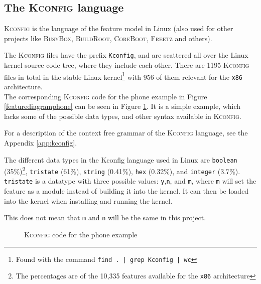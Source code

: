 \documentclass[a4paper,11pt]{report}
\newcommand{\f}{\footnote{\fn}}
\newcommand{\textcode}[1]{\fboxsep=1pt\texttt{\colorbox{gray!20}{#1}}}
\newcommand{\figa}{
    \begin{figure}[!htpb]
    \centering
}
\newcommand{\figb}[2]{
    \caption{#1}
    \label{#2}
    \end{figure}
}
\begin{document}
            \subsection{The \textsc{Kconfig} language} 
\textsc{Kconfig} is the language of the feature model in Linux (also used for 
other projects like \textsc{BusyBox}, \textsc{BuildRoot}, \textsc{CoreBoot}, 
\textsc{Freetz} and others)\cite[p. 4]{VarModSSD}.

            \def \fn{Found with the command \textcode{find .\ | grep Kconfig | wc}}

The \textsc{Kconfig} files have the prefix \textcode{Kconfig}, and are 
scattered all over the Linux kernel source code tree, where they include each 
other. There are 1195 \textsc{Kconfig} files in total in the stable Linux kernel\f
with 956 of them relevant for the \texttt{x86} architecture.
\\

The corresponding \textsc{Kconfig} code for the phone example in Figure 
\ref{featurediagramphone} can be seen in Figure \ref{kconfigphone}. It 
is a simple example, which lacks some of the possible data types, and other 
syntax available in \textsc{Kconfig}.

For a description of the context free grammar of 
the \textsc{Kconfig} language, see the Appendix \ref{app:kconfig}.
\\

            \def \fn {The percentages are of the 10,335 features available for 
                the \texttt{x86} architecture}

The different data types in the Kconfig language used in Linux are 
\textcode{boolean} (35\%)\f, 
\textcode{tristate} (61\%), \textcode{string} (0.41\%), \textcode{hex} 
(0.32\%), and \textcode{integer} (3.7\%). \texttt{tristate} is a datatype 
with three possible values: \texttt{y},\texttt{n}, and \texttt{m}, where 
\texttt{m} will set the feature as a module instead of building it into the 
kernel. It can then be loaded into the kernel when installing and running the 
kernel.

This does not mean that \texttt{m} and \texttt{n} will be the same in this 
project.




\figa
    \subfigure{
        
    }
\figb{\textsc{Kconfig} code for the phone example}{kconfigphone}

\end{document}
